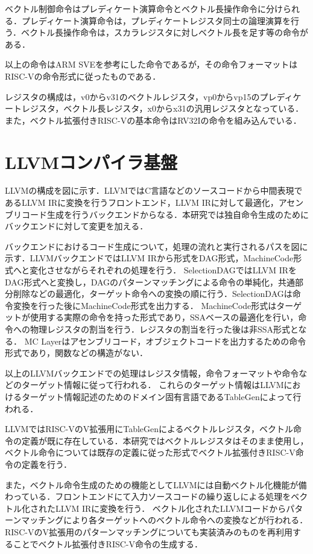 \documentclass[a4paper,9pt, twocolumn]{jarticle}
\begin{document}
ベクトル制御命令はプレディケート演算命令とベクトル長操作命令に分けられる．プレディケート演算命令は，プレディケートレジスタ同士の論理演算を行う．ベクトル長操作命令は，スカラレジスタに対しベクトル長を足す等の命令がある．

以上の命令はARM SVEを参考にした命令であるが，その命令フォーマットはRISC-Vの命令形式に従ったものである．

レジスタの構成は，v0からv31のベクトルレジスタ，vp0からvp15のプレディケートレジスタ，ベクトル長レジスタ，x0からx31の汎用レジスタとなっている．
また，ベクトル拡張付きRISC-Vの基本命令はRV32Iの命令を組み込んでいる．

\section{LLVMコンパイラ基盤}
LLVMの構成を図に示す．LLVMではC言語などのソースコードから中間表現であるLLVM IRに変換を行うフロントエンド，LLVM IRに対して最適化，アセンブリコード生成を行うバックエンドからなる．本研究では独自命令生成のためにバックエンドに対して変更を加える．

バックエンドにおけるコード生成について，処理の流れと実行されるパスを図に示す．LLVMバックエンドではLLVM IRから形式をDAG形式，MachineCode形式へと変化させながらそれぞれの処理を行う．
SelectionDAGではLLVM IRをDAG形式へと変換し，DAGのパターンマッチングによる命令の単純化，共通部分削除などの最適化，ターゲット命令への変換の順に行う．SelectionDAGは命令変換を行った後にMachineCode形式を出力する．
MachineCode形式はターゲットが使用する実際の命令を持った形式であり，SSAベースの最適化を行い，命令への物理レジスタの割当を行う．レジスタの割当を行った後は非SSA形式となる．
MC Layerはアセンブリコード，オブジェクトコードを出力するための命令形式であり，関数などの構造がない．

以上のLLVMバックエンドでの処理はレジスタ情報，命令フォーマットや命令などのターゲット情報に従って行われる．
これらのターゲット情報はLLVMにおけるターゲット情報記述のためのドメイン固有言語であるTableGenによって行われる．

LLVMではRISC-VのV拡張用にTableGenによるベクトルレジスタ，ベクトル命令の定義が既に存在している．本研究ではベクトルレジスタはそのまま使用し，ベクトル命令については既存の定義に従った形式でベクトル拡張付きRISC-V命令の定義を行う．

また，ベクトル命令生成のための機能としてLLVMには自動ベクトル化機能が備わっている．フロントエンドにて入力ソースコードの繰り返しによる処理をベクトル化されたLLVM IRに変換を行う．
ベクトル化されたLLVMコードからパターンマッチングにより各ターゲットへのベクトル命令への変換などが行われる．RISC-VのV拡張用のパターンマッチングについても実装済みのものを再利用することでベクトル拡張付きRISC-V命令の生成する．
\end{document}
